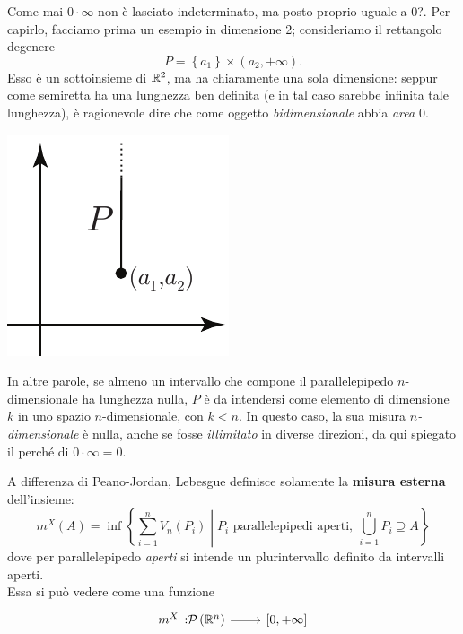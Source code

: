 	\begin{observe}
		Come mai $0\cdot \infty$ non è lasciato indeterminato, ma posto proprio uguale a 0?. Per capirlo, facciamo prima un esempio in dimensione 2; consideriamo il rettangolo degenere
		\begin{equation*}
			P=\left\{a_1\right\}\times\left(a_2,+\infty\right).
		\end{equation*}
		Esso è un sottoinsieme di $\mathbb{R}^2$, ma ha chiaramente una sola dimensione: seppur come semiretta ha una lunghezza ben definita (e in tal caso sarebbe infinita tale lunghezza), è ragionevole dire che come oggetto \textit{bidimensionale} abbia \textit{area} $0$.
		\begin{center}
			\includegraphics[trim=0cm 0cm 0cm 0cm, clip, scale=0.71]{images/rettangolodegenere.pdf}
		\end{center}
		In altre parole, se almeno un intervallo che compone il parallelepipedo $n$-dimensionale ha lunghezza nulla, $P$ è da intendersi come elemento di dimensione $k$ in uno spazio $n$-dimensionale, con $k< n$.
		In questo caso, la sua misura $n$\textit{-dimensionale} è nulla, anche se fosse \textit{illimitato} in diverse direzioni, da qui spiegato il perché di $0\cdot \infty =0$.
	\end{observe}
	A differenza di Peano-Jordan, Lebesgue definisce solamente la \textbf{misura esterna} dell'insieme:
	\begin{equation}
		m^X\left(A\right)=\inf\left\{\sum_{i=1}^{n}V_n\left(P_i\right)\middle| P_i\text{ parallelepipedi aperti},\ \bigcup_{i=1}^nP_i\supseteq A\right\}
	\end{equation}
dove per parallelepipedo \textit{aperti} si intende un plurintervallo definito da intervalli aperti.\\ 
	Essa si può vedere come una funzione
	\begin{equation}
		\funz{m^X}{\setpart{\realset^n}}{\left[0,+\infty\right]}
	\end{equation}
